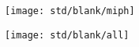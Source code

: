 \thispagestyle{empty}%
\mbox{}
\vfill
\centering\texttt{[image: std/blank/miph]}
\vfill

\clearpage

 \thispagestyle{empty}%
 \mbox{}
 \vfill
\centering\texttt{[image: std/blank/all]}
\vfill

\clearpage

% 

